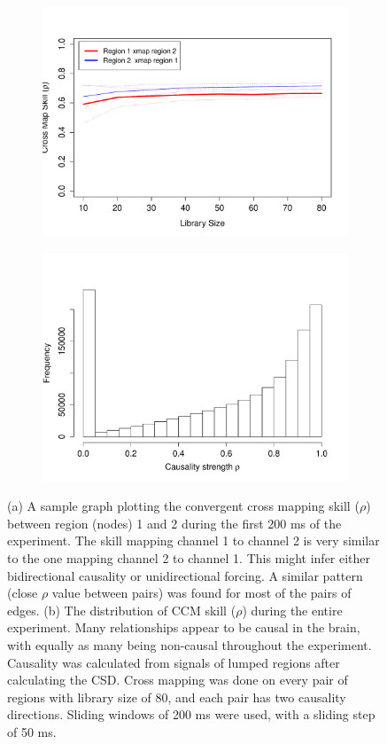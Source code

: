 \documentclass[journal,12pt,onecolumn,draftclsnofoot]{IEEEtran}  %
\begin{document}
\begin{figure}[H]  
	\centering
	\begin{subfigure}{0.45\textwidth}
		\includegraphics[width=\linewidth]{figures/sample_pairwise_causality_measure.pdf}
		\caption{}
		\label{fig:sample_pair_causality_plot}
	\end{subfigure}
	\begin{subfigure}{0.45\textwidth}
		\centering
		\includegraphics[width=1\linewidth]{figures/rho_hist_all_experiment.pdf}
		\caption{}
		\label{fig:rho_hist_all_experiment}
	\end{subfigure}
	\caption{(a) A sample graph plotting the convergent cross mapping skill ($\rho$) between region (nodes) 1 and 2 during the first 200 ms of the experiment. The skill mapping channel 1 to channel 2 is very similar to the one mapping channel 2 to channel 1. This might infer either bidirectional causality or unidirectional forcing. A similar pattern (close $\rho$ value between pairs) was found for most of the pairs of edges. (b) The distribution of CCM skill ($\rho$) during the entire experiment. Many relationships appear to be causal in the brain, with equally as many being non-causal throughout the experiment. Causality was calculated from signals of lumped regions after calculating the CSD. Cross mapping was done on every pair of regions with library size of 80, and each pair has two causality directions. Sliding windows of 200 ms were used, with a sliding step of 50 ms.}

\end{figure}
\end{document}

